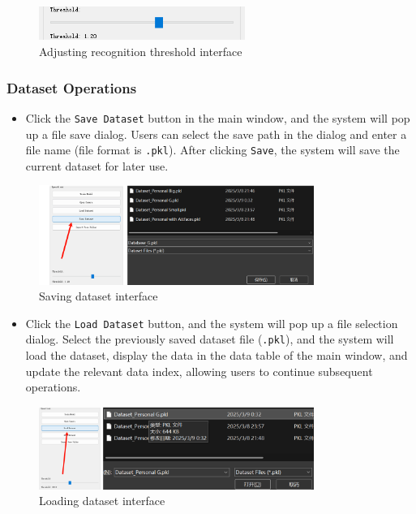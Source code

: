 \documentclass{article}
\begin{document}
\begin{figure}[H]
    \centering
    \includegraphics[width=0.6\textwidth]{Img/PixPin_2025-03-09_01-02-00.png}
    \caption{Adjusting recognition threshold interface}
\end{figure}

\subsubsection{Dataset Operations}
\begin{itemize}
    \item Click the \texttt{Save Dataset} button in the main window, and the system will pop up a file save dialog. Users can select the save path in the dialog and enter a file name (file format is \texttt{.pkl}). After clicking \texttt{Save}, the system will save the current dataset for later use.
\end{itemize}

\begin{figure}[H]
    \centering
    \includegraphics[width=0.8\textwidth]{Img/PixPin_2025-03-09_01-05-24.png}
    \caption{Saving dataset interface}
\end{figure}

\begin{itemize}
    \item Click the \texttt{Load Dataset} button, and the system will pop up a file selection dialog. Select the previously saved dataset file (\texttt{.pkl}), and the system will load the dataset, display the data in the data table of the main window, and update the relevant data index, allowing users to continue subsequent operations.
\end{itemize}

\begin{figure}[H]
    \centering
    \includegraphics[width=0.8\textwidth]{Img/PixPin_2025-03-09_02-37-48.png}
    \caption{Loading dataset interface}
\end{figure}
\newpage
\end{document}
